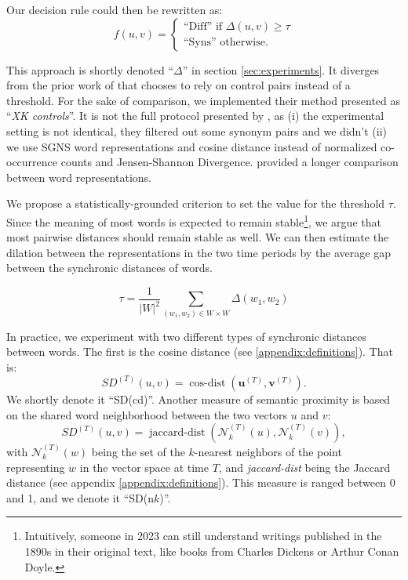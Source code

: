 \documentclass[11pt]{article}
\newcommand{\neigh}[3]{\mathcal{N}_{#1}^{(#2)}\left(#3\right)}
\newcommand{\kneigh}[2]{\neigh{k}{#1}{#2}}
\newcommand{\vocab}{W}
\newcommand{\reprVector}[2]{\mathbf{#1}^{(#2)}}
\newcommand{\reprVectorT}[1]{\reprVector{#1}{T}}
\begin{document}
Our decision rule could then be rewritten as:
\begin{equation}
\label{divCondition}
f(u,v) = \begin{cases}
    \text {``Diff''  if } \Delta(u,v) \geq \tau\\
    \text {``Syns'' otherwise.}
\end{cases}
\end{equation}

This approach is shortly denoted ``$\Delta$'' in section \ref{sec:experiments}. It diverges from the prior work of \citet{xu-kemp-2015-evaluation} that chooses to rely on control pairs instead of a threshold. For the sake of comparison, we implemented their method presented as ``\textit{XK controls}''. It is not the full protocol presented by \citet{xu-kemp-2015-evaluation}, as (i) the experimental setting is not identical, they filtered out some synonym pairs and we didn't (ii) we use SGNS word representations and cosine distance instead of normalized co-occurrence counts and Jensen-Shannon Divergence. \citet{schlechtweg-etal-2019-wind} provided a longer comparison between word representations.

We propose a statistically-grounded criterion to set the value for the threshold $\tau$. Since the meaning of most words is expected to remain stable\footnote{Intuitively, someone in 2023 can still understand writings published in the 1890s in their original text, like books from Charles Dickens or Arthur Conan Doyle.}, we argue that most pairwise distances should remain stable as well. We can then estimate the dilation between the representations in the two time periods by the average gap between the synchronic distances of words. 

\begin{equation}\tau = \frac{1}{|{\vocab}|^2}\sum_{(w_1,w_2)\in{\vocab}\times{\vocab}} \Delta(w_1,w_2)\end{equation}


In practice, we experiment with two different types of synchronic distances between words. The first is the cosine distance (see \ref{appendix:definitions}). That is: 
\begin{equation*}
    SD^{(T)}(u,v) = 
    \operatorname{cos-dist}(\reprVectorT{u},\reprVectorT{v}).
\end{equation*}
We shortly denote it ``SD(cd)''. Another measure of semantic proximity is based on the shared word neighborhood between the two vectors $u$ and $v$:
\begin{equation*}
    SD^{(T)}(u,v) = \operatorname{jaccard-dist}(\kneigh{T}{u}, \kneigh{T}{v}),
\end{equation*} with $\kneigh{T}{w}$ being the set of the $k$-nearest neighbors of the point representing $w$ in the vector space at time $T$, and \textit{jaccard-dist} being the Jaccard distance (see appendix \ref{appendix:definitions}). This measure is ranged between 0 and 1, and we denote it ``SD(n$k$)''.
\end{document}
